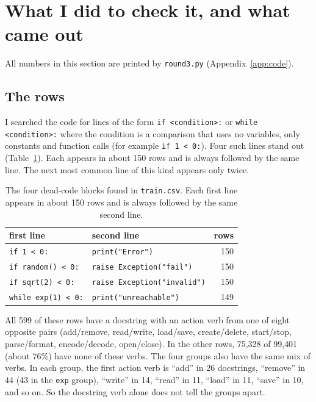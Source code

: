 \documentclass{article}
\newcommand{\code}[1]{\texttt{#1}}
\begin{document}
\section{What I did to check it, and what came out}
\label{sec:check}

All numbers in this section are printed by \code{round3.py} (Appendix~\ref{app:code}).

\subsection{The rows}

I searched the code for lines of the form \code{if <condition>:} or \code{while <condition>:} where
the condition is a comparison that uses no variables, only constants and function calls (for example
\code{if 1 < 0:}). Four such lines stand out (Table~\ref{tab:blocks}). Each appears in about 150 rows and is always
followed by the same line. The next most common line of this kind appears only twice.

\begin{table}[ht]
\centering
\caption{The four dead-code blocks found in \code{train.csv}. Each first line appears in about 150
rows and is always followed by the same second line.}
\label{tab:blocks}
\begin{tabular}{llr}
\toprule
first line & second line & rows \\
\midrule
\code{if 1 < 0:}          & \code{print("Error")}             & 150 \\
\code{if random() < 0:}   & \code{raise Exception("fail")}    & 150 \\
\code{if sqrt(2) < 0:}    & \code{raise Exception("invalid")} & 150 \\
\code{while exp(1) < 0:}  & \code{print("unreachable")}       & 149 \\
\bottomrule
\end{tabular}
\end{table}

All 599 of these rows have a docstring with an action verb from one of eight opposite pairs
(add/remove, read/write, load/save, create/delete, start/stop, parse/format, encode/decode,
open/close). In the other rows, 75{,}328 of 99{,}401 (about 76\%) have none of these verbs. The four
groups also have the same mix of verbs. In each group, the first action verb is ``add'' in 26
docstrings, ``remove'' in 44 (43 in the \code{exp} group), ``write'' in 14, ``read'' in 11, ``load''
in 11, ``save'' in 10, and so on. So the docstring verb alone does not tell the groups apart.
\end{document}
